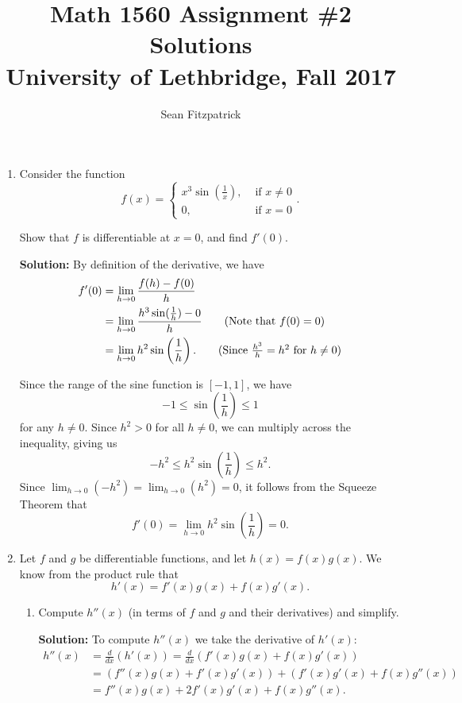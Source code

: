 \documentclass[letterpaper,12pt]{article}
\title{Math 1560 Assignment \#2 Solutions\\University of Lethbridge, Fall 2017}
\author{Sean Fitzpatrick}
\newcommand{\di}{\displaystyle}
\begin{document}
 \maketitle


\begin{enumerate}
\item Consider the function 
\[
f(x)=\begin{cases}x^3\sin\left(\frac{1}{x}\right), & \text{ if } x\neq 0\\0, &\text{ if } x=0\end{cases}.
\]

Show that $f$ is differentiable at $x=0$, and find $f'(0)$.

\medskip

\textbf{Solution:} By definition of the derivative, we have
\begin{align*}
f'(0) & = \lim_{h\to 0}\frac{f(h)-f(0)}{h}\\
& = \lim_{h\to 0}\frac{h^3\sin(\frac{1}{h})-0}{h} \tag{Note that $f(0)=0$}\\
& = \lim_{h\to 0}h^2\sin\left(\frac{1}{h}\right). \tag{Since $\frac{h^3}{h}=h^2$ for $h\neq 0$}
\end{align*}

Since the range of the sine function is $[-1,1]$, we have
\[
-1\leq \sin\left(\frac{1}{h}\right)\leq 1
\]
for any $h\neq 0$. Since $h^2>0$ for all $h\neq 0$, we can multiply across the inequality, giving us
\[
-h^2\leq h^2\sin\left(\frac{1}{h}\right)\leq h^2.
\]
Since $\di \lim_{h\to 0}(-h^2) = \lim_{h\to 0}(h^2) = 0$, it follows from the Squeeze Theorem that
\[
f'(0) = \lim_{h\to 0}h^2\sin\left(\frac{1}{h}\right) = 0.
\]

\pagebreak

\item Let $f$ and $g$ be differentiable functions, and let $h(x)=f(x)g(x)$. We know from the product rule that
\[
h'(x) = f'(x)g(x)+f(x)g'(x).
\]
\begin{enumerate}
\item Compute $h''(x)$ (in terms of $f$ and $g$ and their derivatives) and simplify.

\medskip

\textbf{Solution:} To compute $h''(x)$ we take the derivative of $h'(x)$:
\begin{align*}
h''(x) & = \frac{d}{dx}(h'(x)) = \frac{d}{dx}(f'(x)g(x)+f(x)g'(x))\\
& = (f''(x)g(x)+f'(x)g'(x)) + (f'(x)g'(x)+f(x)g''(x))\\
& = f''(x)g(x) +2f'(x)g'(x)+f(x)g''(x).
\end{align*}


\end{enumerate}
\end{enumerate}
\end{document}
